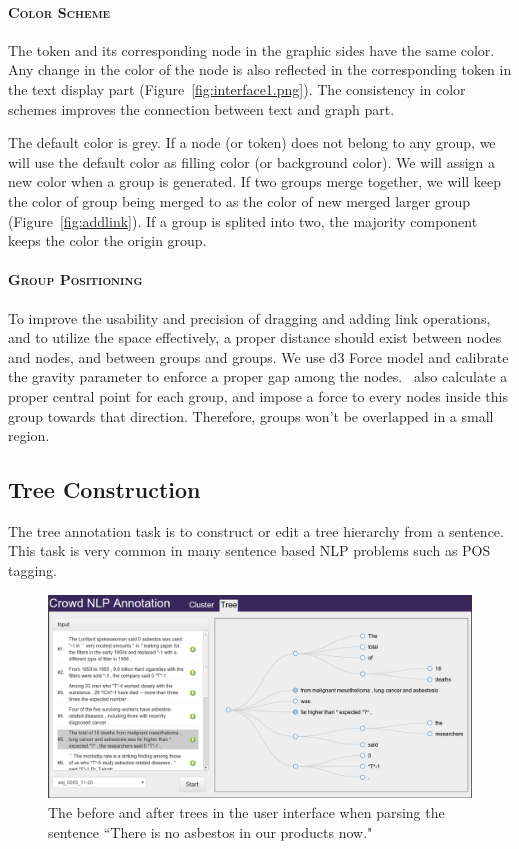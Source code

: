 \paragraph{\textsc{Color Scheme}\\}
The token and its corresponding node in the graphic sides have the same color. Any change in the color of the node is also reflected in the corresponding token in the text display part (Figure~\ref{fig:interface1.png}). The consistency in color schemes improves the connection between text and graph part.

The default color is grey. If a node (or token) does not belong to any group, we will use the default color as filling color (or background color). We will assign a new color when a group is generated. If two groups merge together, we will keep the color of group being merged to as the color of new merged larger group (Figure~\ref{fig:addlink}). If a group is splited into two, the majority component keeps the color the origin group. 

\paragraph{\textsc{Group Positioning}\\}
To improve the usability and precision of dragging and adding link operations, and to utilize the space effectively, a proper distance should exist between nodes and nodes, and between groups and groups. We use d3 Force model and calibrate the gravity parameter to enforce a proper gap among the nodes. \sys\ also calculate a proper central point for each group, and impose a force to every nodes inside this group towards that direction. Therefore, groups won't be overlapped in a small region.

\subsection{Tree Construction}

The tree annotation task is to construct or edit a tree hierarchy from
a sentence. This task is very common in many sentence based NLP
problems such as POS tagging.

\begin{figure}
\centering
\includegraphics[width=6.1in]{figs/interface-tree.png}
\caption{The before and after trees in the user interface when parsing
the sentence {``There is no asbestos in our products now."}}
\label{fig:interface_tree.png}
\end{figure}


